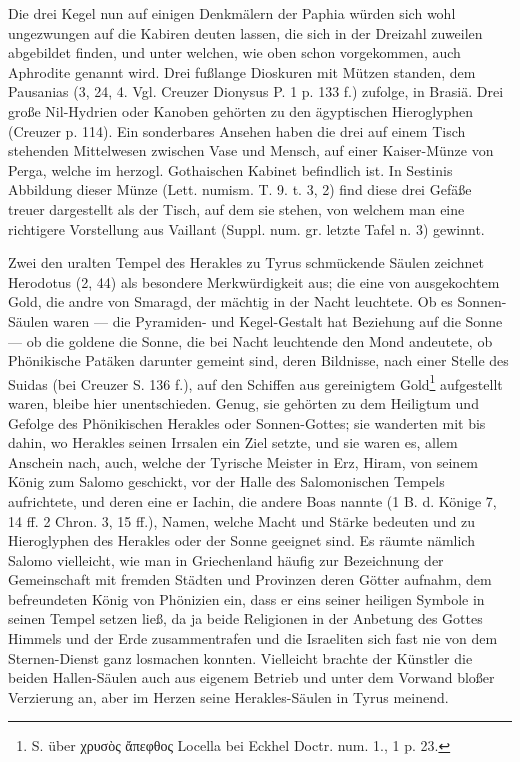 \documentclass[a4paper, 11pt, oneside, polutonikogreek, german]{article}
\begin{document}
Die drei Kegel nun auf einigen Denkmälern der Paphia würden sich wohl ungezwungen auf die Kabiren deuten lassen, die sich in der Dreizahl zuweilen abgebildet finden, und unter welchen, wie oben schon vorgekommen, auch Aphrodite genannt wird. Drei fußlange Dioskuren mit Mützen standen, dem Pausanias (3, 24, 4. Vgl. Creuzer Dionysus P. 1 p. 133 f.) zufolge, in Brasiä. Drei große Nil-Hydrien oder Kanoben gehörten zu den ägyptischen Hieroglyphen (Creuzer p. 114). Ein sonderbares Ansehen haben die drei auf einem Tisch stehenden Mittelwesen zwischen Vase und Mensch, auf einer Kaiser-Münze von Perga, welche im herzogl. Gothaischen Kabinet befindlich ist. In Sestinis Abbildung dieser Münze (Lett. numism. T. 9. t. 3, 2) find diese drei Gefäße treuer dargestellt als der Tisch, auf dem sie stehen, von welchem man eine richtigere Vorstellung aus Vaillant (Suppl. num. gr. letzte Tafel n. 3) gewinnt.

Zwei den uralten Tempel des Herakles zu Tyrus schmückende Säulen zeichnet Herodotus (2, 44) als besondere Merkwürdigkeit aus; die eine von ausgekochtem Gold, die andre von Smaragd, der mächtig in der Nacht leuchtete. Ob es Sonnen-Säulen waren --- die Pyramiden- und Kegel-Gestalt hat Beziehung auf die Sonne --- ob die goldene die Sonne, die bei Nacht leuchtende den Mond andeutete, ob Phönikische Patäken darunter gemeint sind, deren Bildnisse, nach einer Stelle des Suidas (bei Creuzer S. 136 f.), auf den Schiffen aus gereinigtem Gold\footnote{S. über χρυσὸς ἄπεφθος Locella bei Eckhel Doctr. num. 1., 1 p. 23.} aufgestellt waren, bleibe hier unentschieden. Genug, sie gehörten zu dem Heiligtum und Gefolge des Phönikischen Herakles oder Sonnen-Gottes; sie wanderten mit bis dahin, wo Herakles seinen Irrsalen ein Ziel setzte, und sie waren es, allem Anschein nach, auch, welche der Tyrische Meister in Erz, Hiram, von seinem König zum Salomo geschickt, vor der Halle des Salomonischen Tempels aufrichtete, und deren eine er Iachin, die andere Boas nannte (1 B. d. Könige 7, 14 ff. 2 Chron. 3, 15 ff.), Namen, welche Macht und Stärke bedeuten und zu Hieroglyphen des Herakles oder der Sonne geeignet sind. Es räumte nämlich Salomo vielleicht, wie man in Griechenland häufig zur Bezeichnung der Gemeinschaft mit fremden Städten und Provinzen deren Götter aufnahm, dem befreundeten König von Phönizien ein, dass er eins seiner heiligen Symbole in seinen Tempel setzen ließ, da ja beide Religionen in der Anbetung des Gottes Himmels und der Erde zusammentrafen und die Israeliten sich fast nie von dem Sternen-Dienst ganz losmachen konnten. Vielleicht brachte der Künstler die beiden Hallen-Säulen auch aus eigenem Betrieb und unter dem Vorwand bloßer Verzierung an, aber im Herzen seine Herakles-Säulen in Tyrus meinend.
\end{document}
